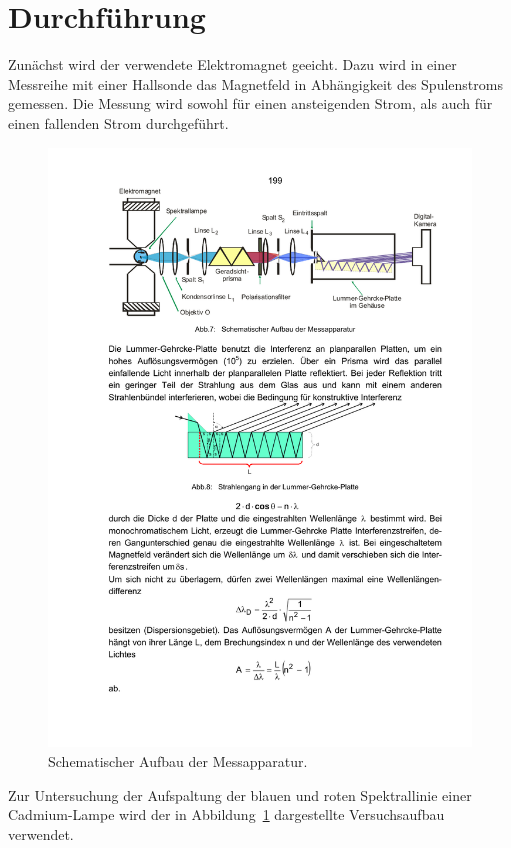 \section{Durchführung}
\label{sec:durchführung}
%
Zunächst wird der verwendete Elektromagnet geeicht.
Dazu wird in einer Messreihe mit einer Hallsonde das Magnetfeld in Abhängigkeit des Spulenstroms gemessen.
Die Messung wird sowohl für einen ansteigenden Strom, als auch für einen fallenden Strom durchgeführt.

\begin{figure}
    \centering
    \includegraphics[width=\textwidth]{figure/messapparatur.pdf}
    \caption{Schematischer Aufbau der Messapparatur.\cite{V27}}
    \label{fig:messapparatur}
\end{figure}
%
Zur Untersuchung der Aufspaltung der blauen und roten Spektrallinie einer Cadmium-Lampe wird der in Abbildung~\ref{fig:messapparatur} dargestellte Versuchsaufbau verwendet.
